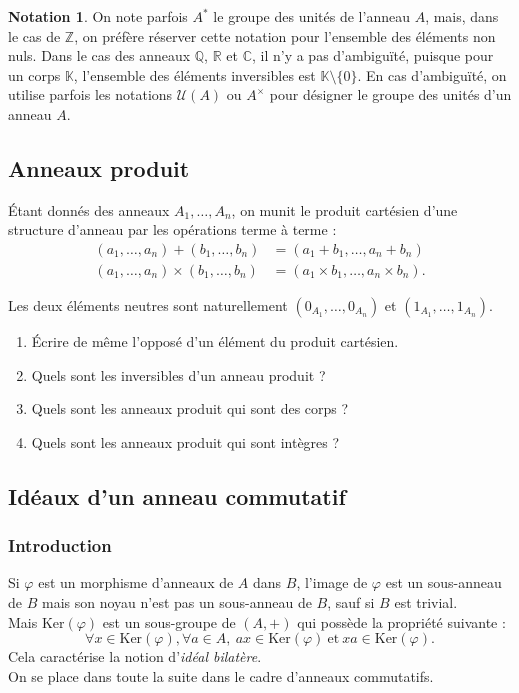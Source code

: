\documentclass[french]{article}
\newcommand{\Z}{\mathbb{Z}}
\newcommand{\Q}{\mathbb{Q}}
\newcommand{\R}{\mathbb{R}}
\newcommand{\C}{\mathbb{C}}
\newcommand{\K}{\mathbb{K}}
\newcommand{\st}{^*}
\renewcommand{\ker}{\text{Ker}}
\theoremstyle{plain}
\theoremstyle{definition}
\newtheorem*{notation}{Notation}
\theoremstyle{remark}
\begin{document}
\begin{notation}
	On note parfois $A\st$ le groupe des unités de l'anneau $A$, mais, dans le cas de $\Z$, on préfère réserver cette notation pour l'ensemble des éléments non nuls. Dans le cas des anneaux $\Q$, $\R$ et $\C$, il n'y a pas d'ambiguïté, puisque pour un corps $\K$, l'ensemble des éléments inversibles est $\K\setminus\{0\}$. En cas d'ambiguïté, on utilise parfois les notations $\mathcal{U}(A)$ ou $A^\times$ pour désigner le groupe des unités d'un anneau $A$.
\end{notation}


\subsection{Anneaux produit}

Étant donnés des anneaux $A_1,\ldots,A_n$, on munit le produit cartésien d'une structure d'anneau par les opérations terme à terme :
\begin{align*}
	(a_1,\ldots,a_n)+(b_1,\ldots,b_n)&=(a_1+b_1,\ldots,a_n+b_n)\\
	(a_1,\ldots,a_n)\times(b_1,\ldots,b_n)&=(a_1\times b_1,\ldots,a_n\times b_n).
\end{align*}

Les deux éléments neutres sont naturellement $(0_{A_1},\ldots,0_{A_n})$ et $(1_{A_1},\ldots,1_{A_n})$.

\begin{exo}
	\begin{enumerate}
		\item Écrire de même l'opposé d'un élément du produit cartésien.
		\item Quels sont les inversibles d'un anneau produit ?
		\item Quels sont les anneaux produit qui sont des corps ?
		\item Quels sont les anneaux produit qui sont intègres ?
	\end{enumerate}
\end{exo}

\subsection{Idéaux d'un anneau commutatif}

\subsubsection*{Introduction}

Si $\varphi$ est un morphisme d'anneaux de $A$ dans $B$, l'image de $\varphi$ est un sous-anneau de $B$ mais son noyau n'est pas un sous-anneau de $B$, sauf si $B$ est trivial.\\
Mais $\ker(\varphi)$ est un sous-groupe de $(A,+)$ qui possède la propriété suivante :
$$\forall x\in\ker(\varphi),\forall a\in A,\ ax\in\ker(\varphi)\ \text{et}\ xa\in\ker(\varphi).$$
Cela caractérise la notion d'\textit{idéal bilatère}.\\
On se place dans toute la suite dans le cadre d'anneaux commutatifs.
\end{document}
